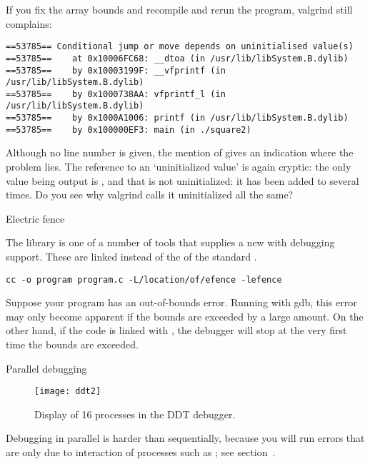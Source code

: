 If you fix the array bounds and recompile and rerun the program,
valgrind still complains:
{\small
\begin{verbatim}
==53785== Conditional jump or move depends on uninitialised value(s)
==53785==    at 0x10006FC68: __dtoa (in /usr/lib/libSystem.B.dylib)
==53785==    by 0x10003199F: __vfprintf (in /usr/lib/libSystem.B.dylib)
==53785==    by 0x1000738AA: vfprintf_l (in /usr/lib/libSystem.B.dylib)
==53785==    by 0x1000A1006: printf (in /usr/lib/libSystem.B.dylib)
==53785==    by 0x100000EF3: main (in ./square2)
\end{verbatim}
}
Although no line number is given, the mention of  gives an
indication where the problem lies.
The reference to an `uninitialized value' is again cryptic: the only
value being output is , and that is not uninitialized: it has
been added to several times. Do you see why valgrind calls it
uninitialized all the same?


 {Electric fence}

The  library is one of a number of tools
that supplies a new  with debugging support.
These are linked instead of the  of the standard
.

\begin{verbatim}
cc -o program program.c -L/location/of/efence -lefence
\end{verbatim}

Suppose your program has an out-of-bounds error. Running with gdb,
this error may only become apparent if the bounds are exceeded by a
large amount. On the other hand, if the code is linked with
, the debugger will stop at the very first time
the bounds are exceeded.

 {Parallel debugging}

\begin{figure}[ht]
\texttt{[image: ddt2]}
\caption{Display of 16 processes in the DDT debugger.}
\label{fig:ddt2}
\end{figure}

Debugging in parallel is harder than sequentially, because you will run
errors that are only due to interaction of processes such as ;
see section~.

